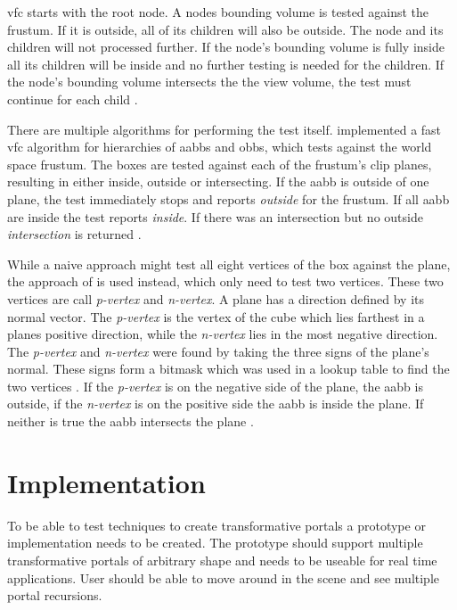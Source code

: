 \Gls{vfc} starts with the root node. A nodes bounding volume is tested against the frustum. If it is outside, all of its children will also be outside. The node and its children will not processed further. If the node's bounding volume is fully inside all its children will be inside and no further testing is needed for the children. If the node's bounding volume intersects the the view volume, the test must continue for each child \cite{akine:2018:realtime}.

There are multiple algorithms for performing the test itself. \textcite{assarsson:2000:optimized} implemented a fast \gls{vfc} algorithm for hierarchies of \glspl{aabb} and \glspl{obb}, which tests against the world space frustum. The boxes are tested against each of the frustum's clip planes, resulting in either inside, outside or intersecting. If the \gls{aabb} is outside of one plane, the test immediately stops and reports \textit{outside} for the frustum. If all \gls{aabb} are inside the test reports \textit{inside}. If there was an intersection but no outside \textit{intersection} is returned \cite{assarsson:2000:optimized}.

While a naive approach might test all eight vertices of the box against the plane, the approach of \textcite{greene:1994:detecting} is used instead, which only need to test two vertices. These two vertices are call  \textit{p-vertex} and \textit{n-vertex}. A plane has a direction defined by its normal vector. The \textit{p-vertex} is the vertex of the cube which lies farthest in a planes positive direction, while the \textit{n-vertex} lies in the most negative direction. The \textit{p-vertex} and \textit{n-vertex} were found by taking the three signs of the plane's normal. These signs form a bitmask which was used in a lookup table to find the two vertices \cite{assarsson:2000:optimized}. If the \textit{p-vertex} is on the negative side of the plane, the \gls{aabb} is outside, if the \textit{n-vertex} is on the positive side the \gls{aabb} is inside the plane. If neither is true the \gls{aabb} intersects the plane \cite{greene:1994:detecting}.

\chapter{Implementation}
\label{section:implementation}
To be able to test techniques to create transformative portals a prototype or implementation needs to be created. The prototype should support multiple transformative portals of arbitrary shape and needs to be useable for real time applications. User should be able to move around in the scene and see multiple portal recursions.

